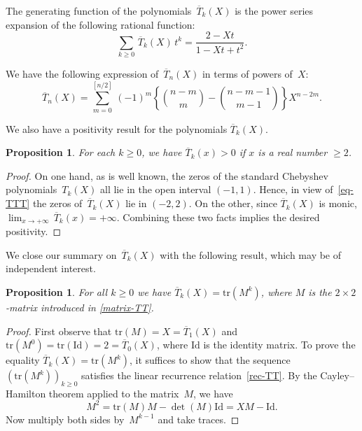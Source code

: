 \documentclass[11pt, a4paper]{amsart}
\newtheorem{prop}[theorem]{Proposition}
\theoremstyle{definition}
\newcommand\tr{\mathrm{tr}}
\newcommand\Id{\mathrm{Id}}
\newcommand\TT{\overline{T}}
\numberwithin{equation}{section}
\begin{document}
The generating function of the polynomials~$\TT_k (X)$ is the power series expansion of the 
following rational function:
\begin{equation}\label{genfun-TT}
\sum_{k \geq 0} \, \TT_k (X) \, t^k = \frac{2 - Xt}{1 - Xt + t^2} .
\end{equation}

We have the following expression of~$\TT_n(X)$ in terms of powers of~$X$:
\begin{equation*}\label{eq-TX}
\TT_n(X) = \sum_{m=0}^{[n/2]} \, (-1)^m \left\{ \binom{n-m}{m} - \binom{n-m-1}{m-1} \right\} X^{n-2m} .
\end{equation*}

We also have a positivity result for the polynomials $\TT_k(X)$.

\begin{prop}\label{TTpos}
For each $k \geq 0$, we have $\TT_k (x) > 0$ if $x$ is a real number $\geq 2$.
\end{prop}

\begin{proof}
On one hand, as is well known,
the zeros of the standard Chebyshev polynomials~$T_k(X)$ all lie in the open interval $(-1,1)$.
Hence, in view of~\eqref{eq-TTT} the zeros of~$\TT_k(X)$ lie in $(-2,2)$. On the other, since $\TT_k(X)$ is monic,
$\lim_{x \to + \infty} \, \TT_k(x) = + \infty$. Combining these two facts implies the desired positivity.
\end{proof}

We close our summary on~$\TT_k (X)$ with the following result, which may be of independent interest.

\begin{prop}\label{prop-recTT}
For all $k\geq 0$ we have $\TT_k (X) = \tr(M^k)$, where $M$ is the $2 \times 2$-matrix introduced in \eqref{matrix-TT}.
\end{prop}

\begin{proof}
First observe that $\tr(M) = X = \TT_1(X)$ and $\tr(M^0) = \tr(\Id) = 2 = \TT_0(X)$, where $\Id$ is the identity matrix.
To prove the equality $\TT_k (X) = \tr(M^k)$, it suffices to show that 
the sequence $(\tr(M^k))_{k\geq 0}$ satisfies the linear recurrence relation~\eqref{rec-TT}. 
By the Cayley--Hamilton theorem applied to the matrix~$M$, we have
\[
M^2 = \tr(M) M - \det(M) \Id = XM - \Id .
\]
Now multiply both sides by~$M^{k-1}$ and take traces.
\end{proof}
\end{document}
